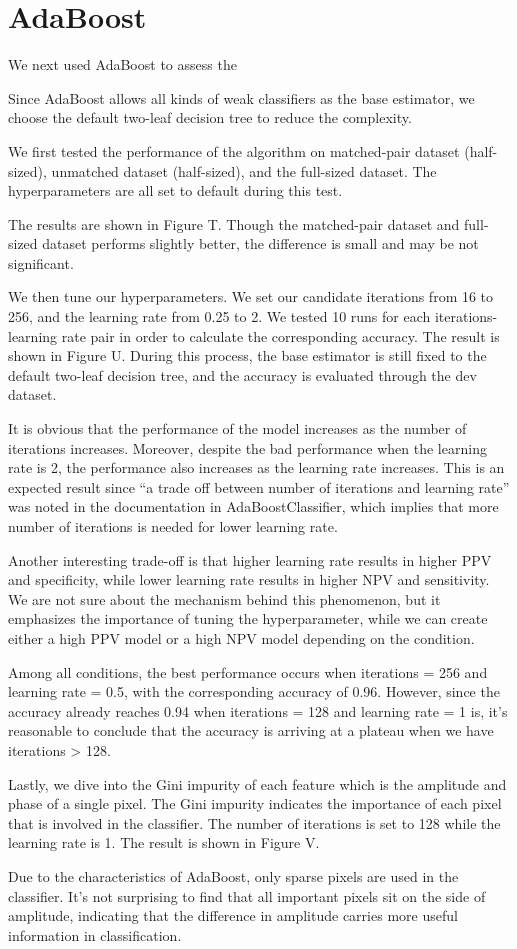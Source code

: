 \section{AdaBoost}
We next used AdaBoost to assess the 

Since AdaBoost allows all kinds of weak classifiers as the base estimator, we choose the default two-leaf decision tree to reduce the complexity.

We first tested the performance of the algorithm on matched-pair dataset (half-sized), unmatched dataset (half-sized), and the full-sized dataset.
The hyperparameters are all set to default during this test.

The results are shown in Figure T. Though the matched-pair dataset and full-sized dataset performs slightly better, the difference is small and may be not significant.

We then tune our hyperparameters. We set our candidate iterations from 16 to 256, and the learning rate from 0.25 to 2. We tested 10 runs for each iterations-learning rate pair in order to calculate the corresponding accuracy. The result is shown in Figure U. During this process, the base estimator is still fixed to the default two-leaf decision tree, and the accuracy is evaluated through the dev dataset.

It is obvious that the performance of the model increases as the number of iterations increases. Moreover, despite the bad performance when the learning rate is 2, the performance also increases as the learning rate increases. This is an expected result since “a trade off between number of iterations and learning rate” was noted in the documentation in AdaBoostClassifier, which implies that more number of iterations is needed for lower learning rate.

Another interesting trade-off is that higher learning rate results in higher PPV and specificity, while lower  learning rate results in higher NPV and sensitivity. We are not sure about the mechanism behind this phenomenon, but it emphasizes the importance of tuning the hyperparameter, while we can create either a high PPV model or a high NPV model depending on the condition.

Among all conditions, the best performance occurs when iterations = 256 and learning rate = 0.5, with the corresponding accuracy of 0.96. However, since the accuracy already reaches 0.94 when iterations = 128 and learning rate = 1 is, it’s reasonable to conclude that the accuracy is arriving at a plateau when we have iterations > 128.

Lastly, we dive into the Gini impurity of each feature which is the amplitude and phase of a single pixel. The Gini impurity indicates the importance of each pixel that is involved in the classifier. The number of iterations is set to 128 while the learning rate is 1. The result is shown in Figure V. 

Due to the characteristics of AdaBoost, only sparse pixels are used in the classifier. It’s not surprising to find that all important pixels sit on the side of amplitude, indicating that the difference in amplitude carries more useful information in classification.
